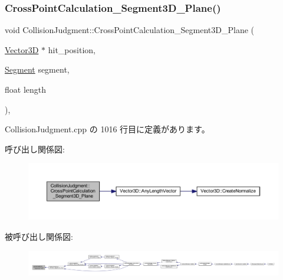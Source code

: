 \subsubsection{\texorpdfstring{Cross\+Point\+Calculation\+\_\+\+Segment3\+D\+\_\+\+Plane()}{CrossPointCalculation\_Segment3D\_Plane()}}
{\footnotesize\ttfamily void Collision\+Judgment\+::\+Cross\+Point\+Calculation\+\_\+\+Segment3\+D\+\_\+\+Plane (\begin{DoxyParamCaption}\item[{\mbox{\hyperlink{class_vector3_d}{Vector3D}} $\ast$}]{hit\+\_\+position,  }\item[{\mbox{\hyperlink{class_segment}{Segment}}}]{segment,  }\item[{float}]{length }\end{DoxyParamCaption})\hspace{0.3cm}{\ttfamily [static]}, {\ttfamily [private]}}



 Collision\+Judgment.\+cpp の 1016 行目に定義があります。

呼び出し関係図\+:\nopagebreak
\begin{figure}[H]
\begin{center}
\leavevmode
\includegraphics[width=350pt]{class_collision_judgment_a1a36d9be481597ed39b42e6f261ee508_cgraph}
\end{center}
\end{figure}
被呼び出し関係図\+:
\nopagebreak
\begin{figure}[H]
\begin{center}
\leavevmode
\includegraphics[width=350pt]{class_collision_judgment_a1a36d9be481597ed39b42e6f261ee508_icgraph}
\end{center}
\end{figure}
\mbox{\label{class_collision_judgment_a5a2de0fe24c1a632c3ee23a20853a57a}} 
